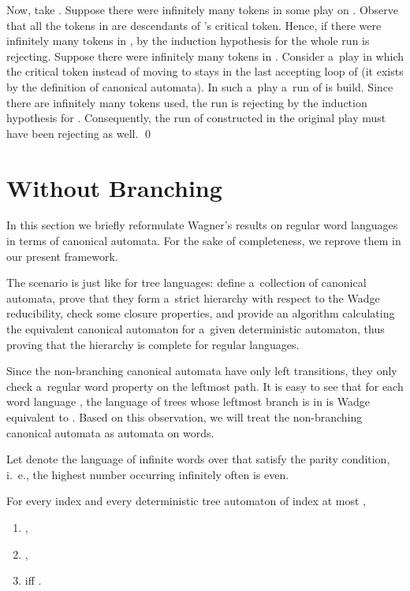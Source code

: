 \documentclass{LMCS}
\begin{document}
Now, take . Suppose there were infinitely many tokens
in some play on . Observe that all the tokens in  are
descendants of 's critical token. Hence, if there were infinitely
many tokens in , by the induction hypothesis for  the whole
run is rejecting. Suppose there were infinitely many tokens in
. Consider a~play in which the critical token instead of moving to
 stays in the last accepting loop of  (it exists by the
definition of canonical automata). In such a~play a~run of  is
build. Since there are infinitely many tokens used, the run is
rejecting by the induction hypothesis for . Consequently, the run
of  constructed in the original play must have been rejecting as
well. \qed

\section{Without Branching} \label{withoutbranching}

In this section we briefly reformulate Wagner's results on regular word languages \cite{wagner} in terms of canonical automata. For the sake of completeness, we reprove them in our present framework. 

The scenario is just like for tree languages: define a~collection of canonical automata, prove that they form a~strict hierarchy with respect to the Wadge reducibility, check some closure properties, and provide an algorithm calculating the equivalent canonical automaton for a~given deterministic automaton, thus proving that the hierarchy is complete for regular languages.

Since the non-branching canonical automata have only left transitions, they only check a~regular word property on the leftmost path. It is easy to see that for each word language , the language of trees whose leftmost branch is in  is Wadge equivalent to . Based on this observation, we will treat the non-branching canonical automata as automata on words. 

Let  denote the language of infinite words over  that satisfy the parity condition, i.~e., the highest number occurring infinitely often is even.

\begin{lem} \label{eliotakappa}
For every index  and every deterministic tree automaton  of index at most , 
\begin{enumerate}[\em(1)]
\item ,
\item , 
\item  iff .
\end{enumerate}
\end{lem}
\end{document}
